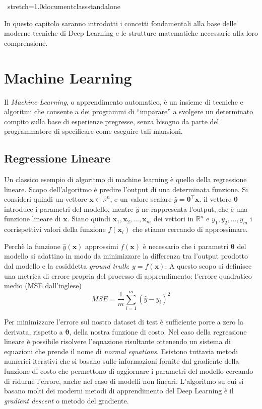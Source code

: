 \, stretch=1.0documentclass{standalone}


In questo capitolo saranno introdotti i concetti fondamentali alla base delle
moderne tecniche di Deep Learning e le strutture matematiche necessarie alla
loro comprensione. \\

\section{Machine Learning}
Il \emph{Machine Learning}, o apprendimento automatico, è un insieme di
tecniche e algoritmi che consente a dei programmi di ``imparare'' a svolgere
un determinato compito sulla base di esperienze pregresse, senza bisogno da
parte del programmatore di specificare come eseguire tali mansioni. 
\subsection{Regressione Lineare}
Un classico esempio di algoritmo di machine learning è quello della regressione
lineare. Scopo dell'algoritmo è predire l'output di una determinata funzione.
Si consideri quindi un vettore $ \bm x \in \mathbb{R}^n $, e un valore scalare
$\hat{y} = \bm \theta^\intercal \bm x$. il vettore $\bm \theta$ introduce i
parametri del modello, mentre $\hat{y}$ ne rappresenta l'output, che è una
funzione lineare di $\bm x$. Siano quindi $ \bm x_1, \bm x_2, \dotsc, \bm x_m $
dei vettori in $\mathbb{R}^n$ e  $ y_1, y_2, \dotsc, y_m $ i corrispettivi
valori della funzione $f(\bm x_i)$ che stiamo cercando di approssimare.

Perchè la funzione $\hat{y}(\bm x)$ approssimi $f(\bm x)$ è necessario che i
parametri $\bm \theta$ del modello si adattino in modo da minimizzare la differenza
tra l'output prodotto dal modello e la cosiddetta \emph{ground truth}: $y =
f(\bm x)$. A questo scopo si definisce una metrica di errore propria del
processo di apprendimento: l'errore quadratico medio (MSE dall'inglese) 
\begin{equation} \label{eq:mse}
  MSE = \frac{1}{m} \sum_{i=1}^m{(\hat{y} - y_i)^2} 
\end{equation}

Per minimizzare l'errore sul nostro dataset di test è sufficiente porre a zero
la derivata, rispetto a $\bm \theta$, della nostra funzione di costo. Nel caso
della regressione lineare è possibile risolvere l'equazione risultante
ottenendo un sistema di equazioni che prende il nome di 
\emph{normal equations}.
Esistono tuttavia metodi numerici iterativi che si basano sulle informazioni
fornite dal gradiente della funzione di costo che permettono di aggiornare i
parametri del modello cercando di ridurne l'errore, anche nel caso di modelli
non lineari. L'algoritmo su cui si basano molti dei moderni metodi di
apprendimento del Deep Learning è il \emph{gradient descent} o metodo del
gradiente.

